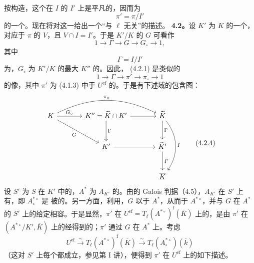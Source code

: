 按构造，这个在 $I$ 的 $I'$ 上是平凡的，因而为
\[
 \pi'=\pi/I' \tag{4.1.3}
\]
的一个。现在将对这一给出一个“与 $\ell$ 无关”的描述。
\textbf{4.2。}设 $K'$ 为 $K$ 的一个，对应于 $\pi$ 的 $V$，且 $V\cap I=I'$。于是 $K'/K$ 的 $G$ 可看作
\[
 1\longrightarrow\Gamma\longrightarrow G\longrightarrow G_\circ\longrightarrow1,
 \tag{4.2.1}
\]
其中
\[
 \Gamma=I/I' \tag{4.2.2}
\]
为，$G_\circ$ 为 $K'/K$ 的最大 $K''$ 的。因此， (4.2.1) 是类似的
\[
 1\longrightarrow\Gamma\longrightarrow\pi'\longrightarrow\pi_\circ\longrightarrow1
 \tag{4.2.3}
\]
的像，其中 $\pi'$ 为 (4.1.3) 中于 $U^{\mathrm{ef}}$ 的。于是有下述域的包含图：
\begin{equation}
\begin{tikzcd}[column sep=large,row sep=large]
 K \arrow[r,"G_\circ"] \arrow[dr,"G"'] \arrow[rr,bend left=26,"\pi_\circ"]
 & K''=\widetilde K\cap K' \arrow[r] \arrow[d,"\Gamma"]
 & \widetilde K \arrow[d,"\Gamma"] \arrow[dd,bend left=37,"I"] \\
 & K' \arrow[r] & \widetilde K' \arrow[d,"I'"] \\
 && \overline K
\end{tikzcd}\tag{4.2.4}
\end{equation}
设 $S'$ 为 $S$ 在 $K'$ 中的，$A^*$ 为 $A_{K'}$ 的。由的 Galois 判据（4.5），$A_{K'}$ 在 $S'$ 上有，即 $A_\circ^{*\circ}$ 是
被的。另一方面，利用，$G$ 以于 $A^*$，从而于 $A^{*\circ}$，并与 $G$ 在 $A^*$ 的 $S'$ 上的给定相容。于是显然，$\pi'$ 在 $U^{\mathrm{ef}}=T_\ell(A^{*\circ})^{\mathrm f}(\overline K)$ 上的，是由 $\pi'$ 在 $(A^{*\circ}/K',\overline K)$ 上的经得到的；$\pi'$ 通过 $G$ 在 $A^*$ 上。考虑
\[
 U^{\mathrm{ef}}\xrightarrow{\sim}T_\ell(A^{*\circ})^{\mathrm f}(\overline K)
 \xrightarrow{\sim}T_\ell(A_\circ^{*\circ})(\overline k)
 \tag{4.2.6}
\]
（这对 $S'$ 上每个都成立，参见第 I 讲），便得到 $\pi'$ 在 $U^{\mathrm{ef}}$ 上的如下描述。

